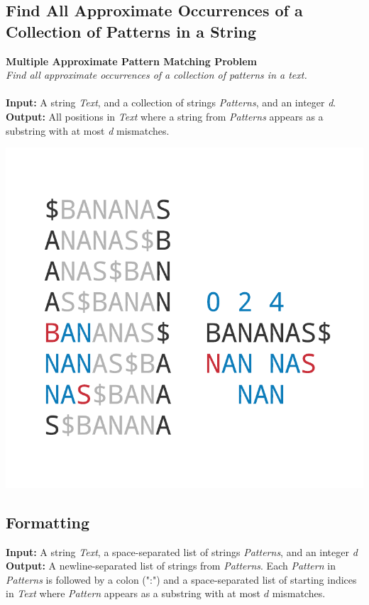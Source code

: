 \documentclass{article}
\begin{document}
\subsection{Find All Approximate Occurrences of a Collection of Patterns in a String}
\hline\vspace{5}
\noindent \textbf{Multiple Approximate Pattern Matching Problem}\\
\emph{Find all approximate occurrences of a collection of patterns in a text.}\\ \\
\textbf{Input:} A string \emph{Text}, and a collection of strings \emph{Patterns}, and an integer \emph{d}.\\
\textbf{Output:} All positions in \emph{Text} where a string from \emph{Patterns} appears as a substring with at most \emph{d} mismatches.
\begin{center}
    \includegraphics[scale=0.2]{c9/logos/9O.png} 
\end{center}
\hline\vspace{5}

\subsection*{Formatting}
\textbf{Input:} A string \emph{Text}, a space-separated list of strings \emph{Patterns}, and an integer \emph{d}\\
\noindent\textbf{Output:} A newline-separated list of strings from \emph{Patterns}. Each \emph{Pattern} in \emph{Patterns} is followed by a colon (":") and a space-separated list of starting indices in \emph{Text} where \emph{Pattern} appears as a substring with at most $d$ mismatches.
\end{document}
